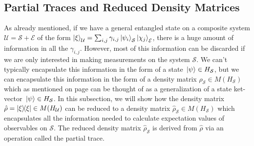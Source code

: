     \subsection{Partial Traces and Reduced Density Matrices}
    As already mentioned, if we have a general entangled state on a composite system $\mathcal{U}=\mathcal{S}+\mathcal{E}$ of the form  $\ket{\xi}_\mathcal{U}=\sum_{i,j}\gamma_{i,j}\ket{\psi_i}_\mathcal{S}\ket{\chi_j}_\mathcal{E}$, there is a huge amount of information in all the $\gamma_{i,j}$. However, most of this information can be discarded if we are only interested in making measurements on the system $\mathcal{S}$. We can't typically encapsulate this information in the form of a state $\ket*{\psi}\in H_\mathcal{S}$, but we can encapsulate this information in the form of a density matrix $\hat{\rho}_\mathcal{S}\in M(H_\mathcal{S})$ which as mentioned on page \pageref{genket} can be thought of as a generalization of a state ket-vector $\ket*{\psi}\in H_\mathcal{S}$. In this subsection, we will show how the density matrix $\hat{\rho}=\dyad{\xi}\in M(H_\mathcal{U})$ can be reduced to a density matrix $\hat{\rho}_\mathcal{S}\in M(H_\mathcal{S})$ which encapsulates all the information needed to calculate expectation values of observables on $\mathcal{S}$. The reduced density matrix $\hat{\rho}_\mathcal{S}$ is derived from $\hat{\rho}$ via an operation called the partial trace.
    
